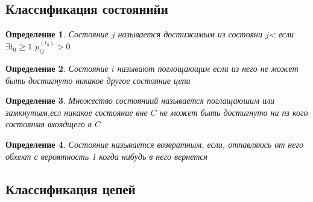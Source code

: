 \documentclass[14pt]{extarticle}
\newtheorem{definition}{Определение}
\begin{document}
\subsection{Классификация состоянийи}
\begin{definition}
	Состояние $j$ 
	называется достижимым из состояни  $j$<
	если  $\exists  t_0 \ge  1$  $p_{ij}^{(t_0)} > 0$
\end{definition}
\begin{definition}
	Состояние $i$ называют поглощающим
	если из него не может быть достигнуто никакое другое состояние цепи
\end{definition}
\begin{definition}
	Множество состояниий называется поглащаюшим или замкнутым,есл никакое состояние вне $C$ не может быть достигнуто
	ни пз кого состоянмя вхоядщего в  $C$
\end{definition}
\begin{definition}
	Состояние называется возвратным, если, отпавляюсь от него обхект с вероятность 1 когда нибудь в него вернется
\end{definition}
\subsection{Классификация цепей}
\end{document}
